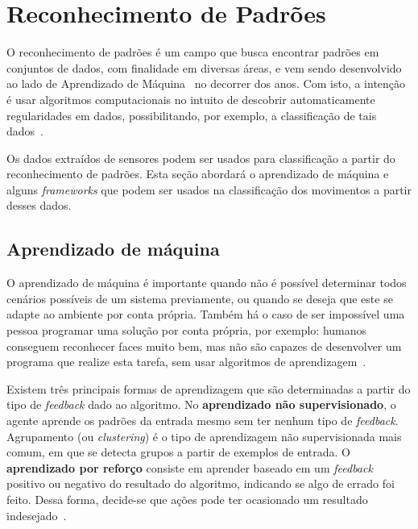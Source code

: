 
\section{Reconhecimento de Padrões}\label{sec:patternrec}

O reconhecimento de padrões é um campo que busca encontrar padrões em conjuntos de dados, com finalidade em diversas áreas, e vem sendo desenvolvido ao lado de Aprendizado de Máquina~\cite{samuel:1959machine_learning} no decorrer dos anos. Com isto, a intenção é usar algoritmos computacionais no intuito de descobrir automaticamente regularidades em dados, possibilitando, por exemplo, a classificação de tais dados~\cite{bishop:2006}.

Os dados extraídos de sensores podem ser usados para classificação a partir do reconhecimento de padrões. Esta seção abordará o aprendizado de máquina e alguns \textit{frameworks} que podem ser usados na classificação dos movimentos a partir desses dados.

\subsection{Aprendizado de máquina}\label{sec:ml}

O aprendizado de máquina é importante quando não é possível determinar todos cenários possíveis de um sistema previamente, ou quando se deseja que este se adapte ao ambiente por conta própria. Também há o caso de ser impossível uma pessoa programar uma solução por conta própria, por exemplo: humanos conseguem reconhecer faces muito bem, mas não são capazes de desenvolver um programa que realize esta tarefa, sem usar algoritmos de aprendizagem~\cite{russell:2010}.

Existem três principais formas de aprendizagem que são determinadas a partir do tipo de \textit{feedback} dado ao algoritmo. No \textbf{aprendizado não supervisionado}, o agente aprende os padrões da entrada mesmo sem ter nenhum tipo de \textit{feedback}. Agrupamento (ou \textit{clustering}) é o tipo de aprendizagem não supervisionada mais comum, em que se detecta grupos a partir de exemplos de entrada. O \textbf{aprendizado por reforço} consiste em aprender baseado em um \textit{feedback} positivo ou negativo do resultado do algoritmo, indicando se algo de errado foi feito. Dessa forma, decide-se que ações pode ter ocasionado um resultado indesejado~\cite{russell:2010}.

